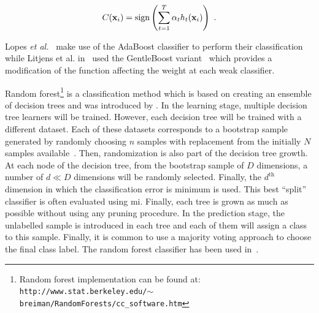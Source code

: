 \begin{equation}
	C(\mathbf{x}_i) = \operatorname*{sign} \left( \sum_{t=1}^{T} \alpha_t h_t(\mathbf{x}_i) \right) \ .
	\label{eq:strclaada}
\end{equation}

Lopes \textit{et al.}~\cite{Lopes2011} make use of the AdaBoost classifier to perform their classification while Litjens et al. in~\cite{Litjens2014} used the GentleBoost variant~\cite{Friedman1998} which provides a modification of the function affecting the weight at each weak classifier.

Random forest\footnote{Random forest implementation can be found at: \texttt{http://www.stat.berkeley.edu/\allowbreak $\sim$breiman/RandomForests/cc\_software.htm}} is a classification method which is based on creating an ensemble of decision trees and was introduced by \cite{Breiman2001}.
In the learning stage, multiple decision tree learners \cite{Breiman1984} will be trained.
However, each decision tree will be trained with a different dataset.
Each of these datasets corresponds to a bootstrap sample generated by randomly choosing $n$ samples with replacement from the initially $N$ samples available~\cite{Efron1979}.
Then, randomization is also part of the decision tree growth.
At each node of the decision tree, from the bootstrap sample of $D$ dimensions, a number of $d \ll D$ dimensions will be randomly selected.
Finally, the $d^{\text{th}}$ dimension in which the classification error is minimum is used.
This best ``split'' classifier is often evaluated using \ac{mi}.
Finally, each tree is grown as much as possible without using any pruning procedure.
In the prediction stage, the unlabelled sample is introduced in each tree and each of them will assign a class to this sample.
Finally, it is common to use a majority voting approach to choose the final class label.
The random forest classifier has been used in~\cite{Kelm2007,Litjens2014,Tiwari2012,Tiwari2013,Viswanath2009}.


